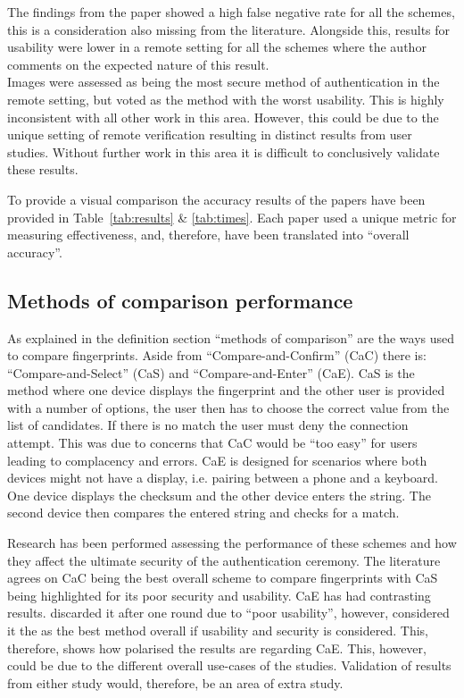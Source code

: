 The findings from the paper showed a high false negative rate for all the schemes, this is a consideration also missing from the literature. Alongside this, results for usability were lower in a remote setting for all the schemes where the author comments on the expected nature of this result.\\
Images were assessed as being the most secure method of authentication in the remote setting, but voted as the method with the worst usability. This is highly inconsistent with all other work in this area. However, this could be due to the unique setting of remote verification resulting in distinct results from user studies. Without further work in this area it is difficult to conclusively validate these results.

To provide a visual comparison the accuracy results of the papers have been provided in Table~\ref{tab:results} \& \ref{tab:times}. Each paper used a unique metric for measuring effectiveness, and, therefore, have been translated into ``overall accuracy''.

\subsection*{Methods of comparison performance}
As explained in the definition section ``methods of comparison'' are the ways used to compare fingerprints. Aside from ``Compare-and-Confirm'' (CaC) there is: ``Compare-and-Select'' (CaS) and ``Compare-and-Enter'' (CaE). CaS is the method where one device displays the fingerprint and the other user is provided with a number of options, the user then has to choose the correct value from the list of candidates. If there is no match the user must deny the connection attempt. This was due to concerns that CaC would be ``too easy'' for users leading to complacency and errors\cite{uzun2007usability}. CaE is designed for scenarios where both devices might not have a display, i.e. pairing between a phone and a keyboard. One device displays the checksum and the other device enters the string. The second device then compares the entered string and checks for a match.

Research has been performed assessing the performance of these schemes and how they affect the ultimate security of the authentication ceremony. The literature agrees on CaC being the best overall scheme to compare fingerprints \cite{tan2017can}\cite{uzun2007usability} with CaS being highlighted for its poor security and usability. CaE has  had contrasting results. \cite{uzun2007usability} discarded it after one round due to ``poor usability'', however, \cite{tan2017can} considered it the as the best method overall if usability and security is considered. This, therefore, shows how polarised the results are regarding CaE. This, however, could be due to the different overall use-cases of the studies. Validation of results from either study would, therefore, be an area of extra study.

